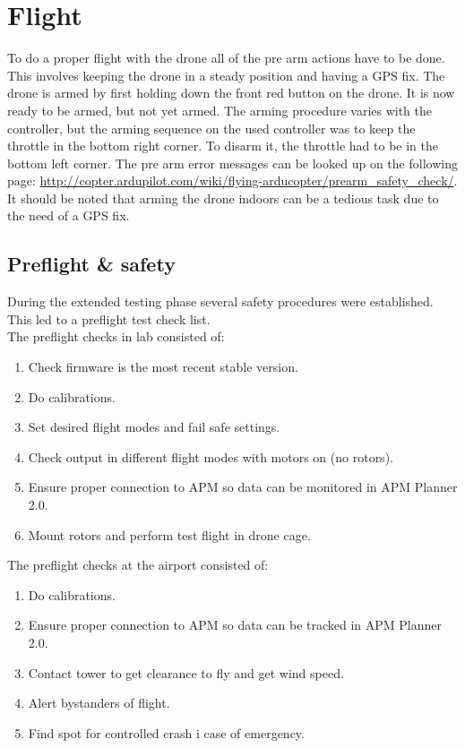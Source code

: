 \section{Flight}
To do a proper flight with the drone all of the pre arm actions have to be done. This involves
keeping the drone in a steady position and having a GPS fix. The drone is armed by first
holding down the front red button on the drone. It is now ready to be armed, but not yet armed.
The arming procedure varies with the controller, but the arming sequence on the used controller
was to keep the throttle in the bottom right corner. To disarm it, the throttle had to be in the
bottom
left corner. The pre arm error messages can be looked up on the following page:
\url{http://copter.ardupilot.com/wiki/flying-arducopter/prearm_safety_check/}. It should be noted
that arming the drone indoors can be a tedious task due to the need of a GPS fix.\\

\subsection{Preflight \& safety}
During the extended testing phase several safety procedures were established. This led to a
preflight test check list.\\
The preflight checks in lab consisted of:
\begin{enumerate}
\item Check firmware is the most recent stable version.
\item Do calibrations.
\item Set desired flight modes and fail safe settings.
\item Check output in different flight modes with motors on (no rotors).
\item Ensure proper connection to APM so data can be monitored in APM Planner 2.0.
\item Mount rotors and perform test flight in drone cage.
\end{enumerate}

The preflight checks at the airport consisted of:
\begin{enumerate}
\item Do calibrations.
\item Ensure proper connection to APM so data can be tracked in APM Planner 2.0.
\item Contact tower to get clearance to fly and get wind speed.
\item Alert bystanders of flight.
\item Find spot for controlled crash i case of emergency.
\end{enumerate}


